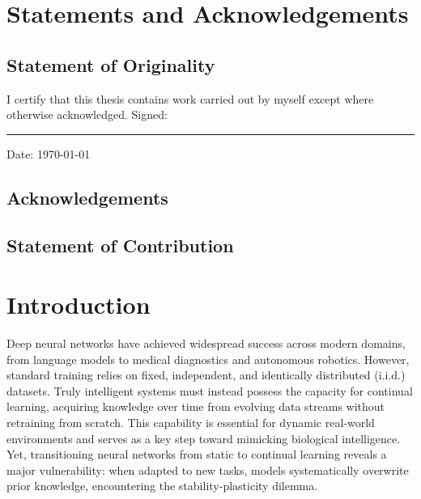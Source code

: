 \documentclass[11pt,oneside]{report}
\begin{document}
\chapter*{Statements and Acknowledgements}

\section*{Statement of Originality}
I certify that this thesis contains work carried out by myself except where otherwise acknowledged.
\vspace{0.5cm}
\noindent Signed: \rule{4cm}{0.4pt} \hfill Date: \today

\section*{Acknowledgements}
\lipsum[3]

\section*{Statement of Contribution}
\lipsum[4-5]

\clearpage
{}
\tableofcontents
\clearpage


\chapter*{Introduction}
\label{chap:intro}
Deep neural networks have achieved widespread success across modern domains, from language models to medical diagnostics and autonomous robotics. However, standard training relies on fixed, independent, and identically distributed (i.i.d.) datasets. Truly intelligent systems must instead possess the capacity for continual learning, acquiring knowledge over time from evolving data streams without retraining from scratch. This capability is essential for dynamic real-world environments and serves as a key step toward mimicking biological intelligence. Yet, transitioning neural networks from static to continual learning reveals a major vulnerability: when adapted to new tasks, models systematically overwrite prior knowledge, encountering the stability-plasticity dilemma.
\end{document}
